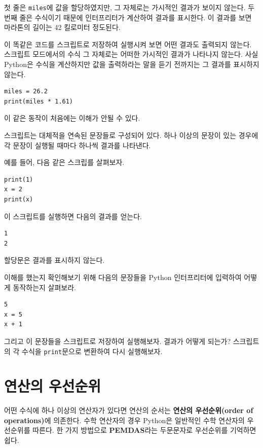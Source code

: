 \documentclass[10pt]{book}
\begin{document}
첫 줄은 {\tt miles}에 값을 할당하였지만, 그 자체로는 가시적인 결과가
보이지 않는다.  두 번째 줄은 수식이기 때문에 인터프리터가 계산하여
결과를 표시한다. 이 결과를 보면 마라톤의 길이는 42 킬로미터 정도된다.

이 똑같은 코드를 스크립트로 저장하여 실행시켜 보면 어떤 결과도 출력되지
않는다.  스크립트 모드에서의 수식 그 자체로는 어떠한 가시적인 결과가
나타나지 않는다.  사실 Python은 수식을 계산하지만 값을 출력하라는
말을 듣기 전까지는 그 결과를 표시하지 않는다.


\begin{verbatim}
miles = 26.2
print(miles * 1.61)
\end{verbatim}

이 같은 동작이 처음에는 이해가 안될 수 있다. 

스크립트는 대체적을 연속된 문장들로 구성되어 있다. 하나 이상의 문장이
있는 경우에 각 문장이 실행될 때마다 하나씩 결과를 나타낸다.

예를 들어, 다음 같은 스크립를 살펴보자.

\begin{verbatim}
print(1)
x = 2
print(x)
\end{verbatim}
%
이 스크립트를 실행하면 다음의 결과를 얻는다. 

\begin{verbatim}
1
2
\end{verbatim}
%
할당문은 결과를 표시하지 않는다. 

이해를 했는지 확인해보기 위해 다음의 문장들을 Python 인터프리터에 입력하여 어떻게 동작하는지 살펴보라. 

\begin{verbatim}
5
x = 5
x + 1
\end{verbatim}

그리고 이 문장들을 스크립트로 저장하여 실행해보자.  결과가 어떻게
되는가?  스크립트의 각 수식을 \texttt{print}문으로 변환하여 다시
실행해보자.



\section{연산의 우선순위}

어떤 수식에 하나 이상의 연산자가 있다면 연산의 순서는 {\bf 연산의
  우선순위(order of operations)}에 의존한다.  수학 연산자의 경우
Python은 일반적인 수학 연산자의 우선순위를 따른다.  한 가지 방법으로
{\bf PEMDAS}라는 두문문자로 우선순위를 기억하면 쉽다.
\end{document}
